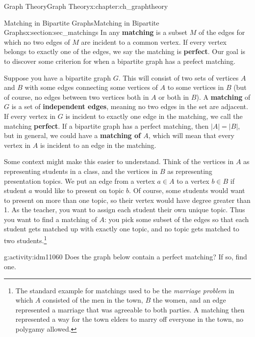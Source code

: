 \documentclass[oneside,10pt,]{book}
\newcommand{\terminology}[1]{\textbf{#1}}
\numberwithin{equation}{chapter}
\newcommand{\card}[1]{\left| #1 \right|}
\begin{document}
\begin{chapterptx}{Graph Theory}{}{Graph Theory}{}{}{x:chapter:ch_graphtheory}
%
\begin{sectionptx}{Matching in Bipartite Graphs}{}{Matching in Bipartite Graphs}{}{}{x:section:sec_matchings}
In any \terminology{matching} is a subset \(M\) of the edges for which no two edges of \(M\) are incident to a common vertex.  If every vertex belongs to exactly one of the edges, we say the matching is \terminology{perfect}. Our goal is to discover some criterion for when a bipartite graph has a prefect matching.%
\par
{} Suppose you have a bipartite graph \(G\). This will consist of two sets of vertices \(A\) and \(B\) with some edges connecting some vertices of \(A\) to some vertices in \(B\) (but of course, no edges between two vertices both in \(A\) or both in \(B\)). A \terminology{matching} of \(G\) is a set of \terminology{independent edges}, meaning no two edges in the set are adjacent.  If every vertex in \(G\) is incident to exactly one edge in the matching, we call the matching \terminology{perfect}. If a bipartite graph has a perfect matching, then \(\card{A} = \card{B}\), but in general, we could have a \terminology{matching of \(A\)}, which will mean that every vertex in \(A\) is incident to an edge in the matching.%
\par
Some context might make this easier to understand. Think of the vertices in \(A\) as representing students in a class, and the vertices in \(B\) as representing presentation topics. We put an edge from a vertex \(a \in A\) to a vertex \(b \in B\) if student \(a\) would like to present on topic \(b\). Of course, some students would want to present on more than one topic, so their vertex would have degree greater than 1. As the teacher, you want to assign each student their own unique topic. Thus you want to find a matching of \(A\): you pick some subset of the edges so that each student gets matched up with exactly one topic, and no topic gets matched to two students.\footnote{The standard example for matchings used to be the \emph{marriage problem} in which \(A\) consisted of the men in the town, \(B\) the women, and an edge represented a marriage that was agreeable to both parties.  A matching then represented a way for the town elders to marry off everyone in the town, no polygamy allowed.\label{g:fn:idm11056}}%
\begin{activity}{}{g:activity:idm11060}%
Does the graph below contain a perfect matching? If so, find one.%
\begin{sidebyside}{1}{0.25}{0.25}{0}%
\begin{sbspanel}{0.5}%

\end{sbspanel}
\end{sidebyside}
\end{activity}
\end{sectionptx}
\end{chapterptx}
\end{document}
